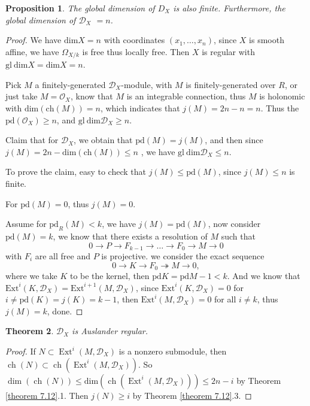 \documentclass[openany]{book}
\newtheorem{theorem}{Theorem}[chapter] %
\newtheorem{proposition}[theorem]{Proposition} %
\theoremstyle{definition} %
\theoremstyle{remark}
\begin{document}
\begin{proposition}
    The global dimension of $D_X$ is also finite. Furthermore, the global dimension of $\mathcal{D}_X$ $=n$.
\end{proposition}
\begin{proof}
    We have $\mathrm{dim}X=n$ with coordinates $(x_{1},\dots,x_{n})$, since $X$ is smooth affine, we have $\Omega_{X /k}$ is free thus locally free. Then $X$ is regular with $\mathrm{gl\ dim}X=\mathrm{dim}X=n$.

    Pick $M$ a finitely-generated $\mathcal{D}_{X}$-module, with $M$ is finitely-generated over $R$, or just take $M=\mathcal{O}_{X}$, know that $M$ is an integrable connection, thus $M$ is holonomic with $\mathrm{dim}(\mathrm{ch}(M))=n$, which indicates that $j(M)=2n-n=n$. Thus the $\mathrm{pd}(\mathcal{O}_{X})\ge n$, and $\mathrm{gl\ dim}\mathcal{D}_{X}\ge n$.

    Claim that for $\mathcal{D}_{X}$, we obtain that $\mathrm{pd}(M)=j(M)$, and then since $j(M)=2n-\mathrm{dim}(\mathrm{ch}(M))\leq n$ , we have $\mathrm{gl\ dim}\mathcal{D}_{X}\leq n$.

    To prove the claim, easy to check that $j(M)\leq \mathrm{pd}(M)$, since $j(M)\leq n$ is finite.

    For $\mathrm{pd}(M)=0$, thus $j(M)=0$.

    Assume for $\mathrm{pd}_{R}(M)<k$, we have $j(M)=\mathrm{pd}(M)$, now consider $\mathrm{pd}(M)=k$, we know that there exists a resolution of $M$ such that $$0\rightarrow P\rightarrow F_{k-1}\rightarrow \dots\rightarrow F_{0}\rightarrow M\rightarrow0$$ with $F_{i}$ are all free and $P$ is projective. we consider the exact sequence $$0\rightarrow K\rightarrow F_{0}\twoheadrightarrow M\rightarrow 0 ,$$where we take $K$ to be the kernel, then $\mathrm{pd}K=\mathrm{pd}M-1<k$. And we know that $\mathrm{Ext}^{i}(K,\mathcal{D}_{X})=\mathrm{Ext}^{i+1}(M,\mathcal{D}_{X})$, since $\mathrm{Ext}^{i}(K,\mathcal{D}_{X})=0$ for $i\neq \mathrm{pd}(K)=j(K)=k-1$, then $\mathrm{Ext}^{i}(M,\mathcal{D}_{X})=0$ for all $i\neq k$, thus $j(M)=k$, done.
\end{proof}

\begin{theorem}
    $\mathcal{D}_{X}$ is Auslander regular.
\end{theorem}
\begin{proof}
    If $N \subset \operatorname{Ext}^{i}(M, \mathcal{D}_X)$ is a nonzero submodule, then $\operatorname{ch}(N) \subset \operatorname{ch}(\operatorname{Ext}^{i}(M, \mathcal{D}_X))$. So $\dim(\operatorname{ch}(N)) \leq \mathrm{dim}(\operatorname{ch}(\operatorname{Ext}^{i}(M, \mathcal{D}_X)))\leq 2n - i$ by Theorem \ref{theorem 7.12}.1. Then $j(N) \geq i$ by Theorem \ref{theorem 7.12}.3.
\end{proof}
\end{document}
